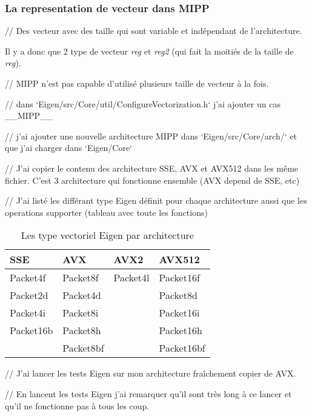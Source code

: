 \subsubsection{La representation de vecteur dans MIPP}
{
  // Des vecteur avec des taille qui sont variable et indépendant de l'architecture.

  Il y a donc que 2 type de vecteur \emph{reg} et \emph{reg2} (qui fait la moitiés de la
  taille de \emph{reg}).

  // MIPP n'est pas capable d'utilisé plusieurs taille de vecteur à la fois.
}



// dans `Eigen/src/Core/util/ConfigureVectorization.h` j'ai ajouter un cas __MIPP__

// j'ai ajouter une nouvelle architecture MIPP dans `Eigen/src/Core/arch/` et que j'ai
charger dans `Eigen/Core`

// J'ai copier le contenu des architecture SSE, AVX et AVX512 dans les même fichier.
C'est 3 architecture qui fonctionne ensemble (AVX depend de SSE, etc)

// J'ai listé les différant type Eigen définit pour chaque architecture aussi que les
operations supporter (tableau avec toute les fonctions)

\begin{table}[H]
  \centering
  \begin{tabular}[H]{|l|l|l|l|}
    \hline
    \textbf{SSE} & \textbf{AVX} & \textbf{AVX2} & \textbf{AVX512} \\
    \hline
    Packet4f     & Packet8f     & Packet4l      & Packet16f       \\
    \hline
    Packet2d     & Packet4d     &               & Packet8d        \\
    \hline
    Packet4i     & Packet8i     &               & Packet16i       \\
    \hline
    Packet16b    & Packet8h     &               & Packet16h       \\
    \hline
                 & Packet8bf    &               & Packet16bf      \\
    \hline
  \end{tabular}
  \caption{Les type vectoriel Eigen par architecture}
\end{table}

// J'ai lancer les tests Eigen sur mon architecture fraîchement copier de AVX.

// En lancent les tests Eigen j'ai remarquer qu'il sont très long à ce lancer et qu'il
ne fonctionne pas à tous les coup.

